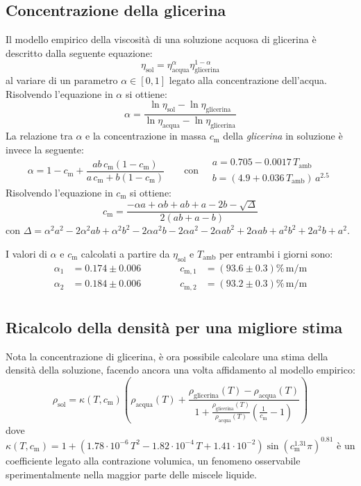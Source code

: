 \documentclass{article}
\begin{document}
\subsection{Concentrazione della glicerina}

Il modello empirico della viscosità di una soluzione acquosa di
glicerina\cite{Cheng2008} è descritto dalla seguente equazione:
\[
  \eta_\text{sol} =
    \eta_\text{acqua}^\alpha \eta_\text{glicerina}^{1-\alpha}
\]
al variare di un parametro $\alpha\in[0,1]$ legato alla
concentrazione dell'acqua. Risolvendo l'equazione in $\alpha$ si
ottiene:
\[
  \alpha = \frac{\ln{\eta_\text{sol}} - \ln{\eta_\text{glicerina}}}
    {\ln{\eta_\text{acqua}} - \ln{\eta_\text{glicerina}}}
\]
La relazione tra $\alpha$ e la concentrazione in massa $c_\text{m}$
della \emph{glicerina} in soluzione è invece la seguente:
\[
  \alpha = 1 - c_\text{m} + \frac{a b\,c_\text{m} (1 - c_\text{m})}
    {a\,c_\text{m} + b (1 - c_\text{m})}
  \qquad\text{con}\quad
  \begin{array}{l}
    a = 0.705 - 0.0017\,T_\text{amb} \\
    b = (4.9 + 0.036\,T_\text{amb})\,a^{2.5}
  \end{array}
\]
Risolvendo l'equazione in $c_\text{m}$ si ottiene:
\[
  c_\text{m} = \frac{
    -\alpha a + \alpha b + ab + a - 2b - \sqrt{\Delta}}{2(ab + a - b)}
\]
con $
\Delta = \alpha^2 a^2 - 2\alpha^2 ab + \alpha^2 b^2 - 2\alpha a^2 b -
2\alpha a^2 - 2\alpha a b^2 + 2\alpha ab + a^2 b^2 + 2a^2 b + a^2$.

\vspace{2mm}
I valori di $\alpha$ e $c_\text{m}$ calcolati a partire da $\eta_\text{sol}$ e
$T_\text{amb}$ per entrambi i giorni sono:
\[
\begin{aligned}
  \alpha_1 &= 0.174\pm0.006
  \qquad\qquad
  c_{\text{m},1} &= (93.6\pm0.3)\%\,\text{m}/\text{m}\\
  \alpha_2 &= 0.184\pm0.006
  \qquad\qquad
  c_{\text{m},2} &= (93.2\pm0.3)\%\,\text{m}/\text{m}\\
\end{aligned}
\]

\subsection{Ricalcolo della densità per una migliore stima}
Nota la concentrazione di glicerina, è ora possibile
calcolare una stima della densità della soluzione, facendo
ancora una volta affidamento al modello empirico\cite{Volk2018}:
\[
  \rho_\text{sol} = \kappa(T,c_\text{m}) \left(
  \rho_\text{acqua}(T) + \frac{
    \rho_\text{glicerina}(T) - \rho_\text{acqua}(T)
  }{1 + \frac{\rho_\text{glicerina}(T)}{\rho_\text{acqua}(T)}
    \!\left(\frac{1}{c_\text{m}} - 1\right)}
  \right)
\]
dove $
  \kappa(T,c_\text{m}) = 1 + \left(
    1.78\cdot10^{-6}\,T^2 - 1.82\cdot10^{-4}\,T + 1.41\cdot10^{-2}
  \right)\sin{\!\left(c_\text{m}^{1.31} \pi\right)}^{0.81}
$ è un coefficiente legato alla contrazione volumica, un fenomeno
osservabile sperimentalmente nella maggior parte delle miscele
liquide.
\end{document}
